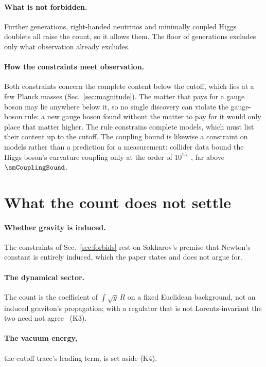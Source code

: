 \documentclass[aps,prd,reprint,amsmath,amssymb,superscriptaddress,nofootinbib]{revtex4-2}
\begin{document}
\paragraph{What is not forbidden.}
Further generations, right-handed neutrinos and minimally coupled Higgs doublets all
raise the count, so it allows them. The floor of \floorGenerationsSpelled{} generations
excludes only what observation already excludes.

\paragraph{How the constraints meet observation.}
Both constraints concern the complete content below the cutoff, which lies at a few
Planck masses (Sec.~\ref{sec:magnitude}). The matter that pays for a gauge boson may lie
anywhere below it, so no single discovery can violate the gauge-boson rule: a new gauge
boson found without the matter to pay for it would only place that matter higher. The
rule constrains complete models, which must list their content up to the cutoff. The
coupling bound is likewise a constraint on models rather than a prediction for a
measurement: collider data bound the Higgs boson's curvature coupling only at the order
of $10^{15}$~\cite{AtkinsCalmet2013}, far above $\smCouplingBound$.

\section{What the count does not settle}
\label{sec:unsettled}

\paragraph{Whether gravity is induced.} The constraints of Sec.~\ref{sec:forbids} rest
on Sakharov's premise that Newton's constant is entirely induced, which the paper
states and does not argue for.

\paragraph{The dynamical sector.} The count is the coefficient of
$\int\!\sqrt g\,R$ on a fixed Euclidean background, not an induced graviton's
propagation; with a regulator that is not Lorentz-invariant the two need not
agree~\cite{Visser2002} (K3).

\paragraph{The vacuum energy,} the cutoff trace's leading term, is set aside (K4).
\end{document}

